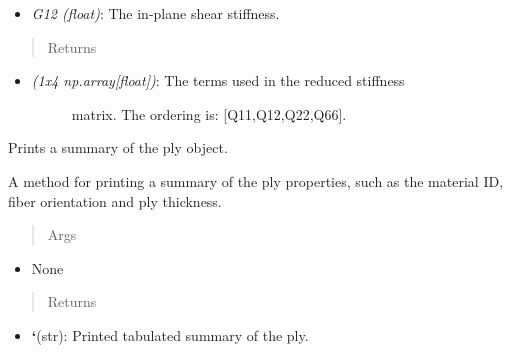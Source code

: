 \documentclass[letterpaper,10pt,english]{sphinxmanual}
\begin{document}
\begin{fulllineitems}
\begin{fulllineitems}
\begin{itemize}
\item {} 
\emph{G12 (float)}: The in-plane shear stiffness.

\end{itemize}
\begin{quote}\begin{description}
\item[{Returns}] \leavevmode
\end{description}\end{quote}
\begin{itemize}
\item {} \begin{description}
\item[{\emph{(1x4 np.array{[}float{]})}: The terms used in the reduced stiffness}] \leavevmode
matrix. The ordering is: {[}Q11,Q12,Q22,Q66{]}.

\end{description}

\end{itemize}

\end{fulllineitems}


\begin{fulllineitems}
\label{structures:AeroComBAT.Structures.Ply.printSummary}
Prints a summary of the ply object.

A method for printing a summary of the ply properties, such as
the material ID, fiber orientation and ply thickness.
\begin{quote}\begin{description}
\item[{Args}] \leavevmode
\end{description}\end{quote}
\begin{itemize}
\item {} 
None

\end{itemize}
\begin{quote}\begin{description}
\item[{Returns}] \leavevmode
\end{description}\end{quote}
\begin{itemize}
\item {} 
{\color{red}\bfseries{}{}`}(str): Printed tabulated summary of the ply.

\end{itemize}

\end{fulllineitems}


\end{fulllineitems}
\end{document}
